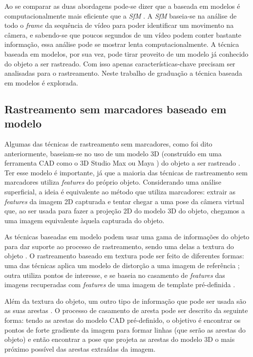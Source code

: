 Ao se comparar as duas abordagens pode-se dizer que a baseada em modelos é computacionalmente mais eficiente que a \emph{SfM} \cite{drummondecipolla}. A \emph{SfM} baseia-se na análise de todo o \emph{frame} da sequência de vídeo para poder identificar um movimento na câmera, e sabendo-se que poucos segundos de um vídeo podem conter bastante informação, essa análise pode se mostrar lenta computacionalmente. A técnica baseada em modelos, por sua vez, pode tirar proveito de um modelo já conhecido do objeto a ser rastreado. Com isso apenas características-chave precisam ser analisadas para o rastreamento. Neste trabalho de graduação a técnica baseada em modelos é explorada.

\subsection{Rastreamento sem marcadores baseado em modelo}

Algumas das técnicas de rastreamento sem marcadores, como foi dito anteriormente, baseiam-se no uso de um modelo 3D (construído em uma ferramenta CAD como o 3D Studio Max \cite{ref_3dsmax} ou Maya \cite{ref_maya}) do objeto a ser rastreado \cite{lepetit}. Ter esse modelo é importante, já que a maioria das técnicas de rastreamento sem marcadores utiliza \emph{features} do próprio objeto. Considerando uma análise superficial, a ideia é equivalente ao método que utiliza marcadores: extrair as \emph{features} da imagem 2D capturada e tentar chegar a uma pose da câmera virtual que, ao ser usada para fazer a projeção 2D do modelo 3D do objeto, chegamos a uma imagem equivalente àquela capturada do objeto.

As técnicas baseadas em modelo podem usar uma gama de informações do objeto para dar suporte ao processo de rastreamento, sendo uma delas a textura do objeto \cite{lima2010model}. O rastreamento baseado em textura pode ser feito de diferentes formas: uma das técnicas aplica um modelo de distorção a uma imagem de referência \cite{ref_19tgchico}; outra utiliza pontos de interesse, e se baseia no casamento de \emph{features} das imagens recuperadas com \emph{features} de uma imagem de template pré-definida \cite{lepetit}.

Além da textura do objeto, um outro tipo de informação que pode ser usada são as suas arestas \cite{lepetit}. O processo de casamento de aresta pode ser descrito da seguinte forma: tendo as arestas do modelo CAD pré-definido, o objetivo é encontrar os pontos de forte gradiente da imagem para formar linhas (que serão as arestas do objeto) e então encontrar a pose que projeta as arestas do modelo 3D o mais próximo possível das arestas extraídas da imagem.

